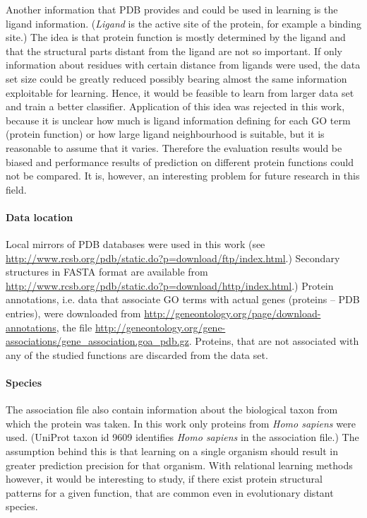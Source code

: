 \documentclass[11pt,twoside,a4paper]{book}
\begin{document}
Another information that PDB provides and could be used in learning is the ligand information.
(\emph{Ligand} is the active site of the protein, for example a binding site.) 
The idea is that protein function is mostly determined by the ligand and
that the structural parts distant from the ligand are not so important.
If only information about residues with certain distance from ligands were used,
the data set size could be greatly reduced possibly bearing almost the same information
exploitable for learning.
Hence, it would be feasible to learn from larger data set and train a better classifier.
Application of this idea was rejected in this work,
because it is unclear how much is ligand information defining for each GO term (protein function)
or how large ligand neighbourhood is suitable,
but it is reasonable to assume that it varies. 
Therefore the evaluation results would be biased and performance results of prediction
on different protein functions could not be compared.
It is, however, an interesting problem for future research in this field.

\paragraph{Data location} Local mirrors of PDB databases were used in this work (see \url{http://www.rcsb.org/pdb/static.do?p=download/ftp/index.html}.)
Secondary structures in FASTA format are available from \url{http://www.rcsb.org/pdb/static.do?p=download/http/index.html}.)
Protein annotations, i.e. data that associate GO terms with actual genes (proteins -- PDB entries), were downloaded from
\url{http://geneontology.org/page/download-annotations}, 
the file \url{http://geneontology.org/gene-associations/gene_association.goa_pdb.gz}.
Proteins, that are not associated with any of the studied functions are discarded from the data set.

\paragraph{Species} The association file also contain information about the biological taxon from which the protein was taken.
In this work only proteins from \emph{Homo sapiens} were used.
(UniProt taxon id 9609 identifies \emph{Homo sapiens} in the association file.) 
The assumption behind this is that learning on a single organism should result in
greater prediction precision for that organism.
With relational learning methods however, it would be interesting to study, if there exist protein
structural patterns for a given function, that are common even in evolutionary distant species.
\end{document}
